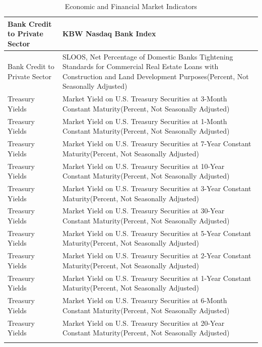 \begin{center}
\begin{singlespace}
\begin{scriptsize}
\begin{longtable}{p{}|p{}}
        \hline
        Bank Credit to Private Sector  & KBW Nasdaq Bank Index \\
        \hline
        Bank Credit to Private Sector  & SLOOS, Net Percentage of Domestic Banks Tightening Standards for Commercial Real Estate Loans with Construction and Land Development Purposes(Percent, Not Seasonally Adjusted) \\
        \hline
        Treasury Yields  & Market Yield on U.S. Treasury Securities at 3-Month Constant Maturity(Percent, Not Seasonally Adjusted) \\
        \hline
        Treasury Yields  & Market Yield on U.S. Treasury Securities at 1-Month Constant Maturity(Percent, Not Seasonally Adjusted) \\
        \hline
        Treasury Yields  & Market Yield on U.S. Treasury Securities at 7-Year Constant Maturity(Percent, Not Seasonally Adjusted) \\
        \hline
        Treasury Yields  & Market Yield on U.S. Treasury Securities at 10-Year Constant Maturity(Percent, Not Seasonally Adjusted) \\
        \hline
        Treasury Yields  & Market Yield on U.S. Treasury Securities at 3-Year Constant Maturity(Percent, Not Seasonally Adjusted) \\
        \hline
        Treasury Yields  & Market Yield on U.S. Treasury Securities at 30-Year Constant Maturity(Percent, Not Seasonally Adjusted) \\
        \hline
        Treasury Yields  & Market Yield on U.S. Treasury Securities at 5-Year Constant Maturity(Percent, Not Seasonally Adjusted) \\
        \hline
        Treasury Yields  & Market Yield on U.S. Treasury Securities at 2-Year Constant Maturity(Percent, Not Seasonally Adjusted) \\
        \hline
        Treasury Yields  & Market Yield on U.S. Treasury Securities at 1-Year Constant Maturity(Percent, Not Seasonally Adjusted) \\
        \hline
        Treasury Yields  & Market Yield on U.S. Treasury Securities at 6-Month Constant Maturity(Percent, Not Seasonally Adjusted) \\
        \hline
        Treasury Yields  & Market Yield on U.S. Treasury Securities at 20-Year Constant Maturity(Percent, Not Seasonally Adjusted) \\
        \bottomrule   
        \caption{Economic and Financial Market Indicators}
        \label{tab:ch2:extracted_data}   
\end{longtable}
\end{scriptsize}
\end{singlespace}
\end{center}




